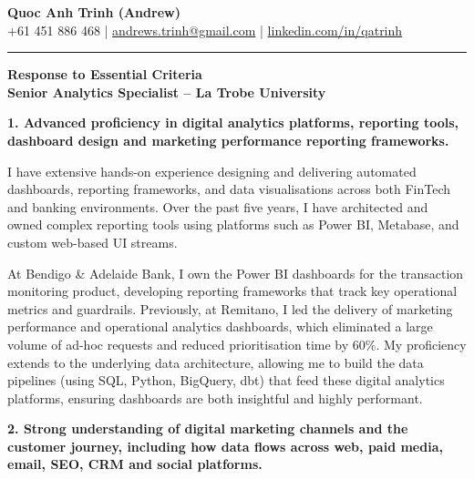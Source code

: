 \documentclass[11pt, a4paper]{article}
\begin{document}
\begin{center}
    {\LARGE \textbf{Quoc Anh Trinh (Andrew)}}\\[4pt]
    {\small
        +61 451 886 468 \quad|\quad
        \href{mailto:andrews.trinh@gmail.com}{andrews.trinh@gmail.com} \quad|\quad
        \href{https://www.linkedin.com/in/qatrinh}{linkedin.com/in/qatrinh}
    }
\end{center}

\vspace{4pt}
\hrule
\vspace{14pt}

\begin{center}
    {\Large \textbf{Response to Essential Criteria}}\\[4pt]
    {\large \textbf{Senior Analytics Specialist -- La Trobe University}}
\end{center}

\vspace{10pt}

\textbf{1. Advanced proficiency in digital analytics platforms, reporting tools, dashboard design and marketing performance reporting frameworks.}

I have extensive hands-on experience designing and delivering automated dashboards, reporting frameworks, and data visualisations across both FinTech and banking environments. Over the past five years, I have architected and owned complex reporting tools using platforms such as Power BI, Metabase, and custom web-based UI streams. 

At Bendigo \& Adelaide Bank, I own the Power BI dashboards for the transaction monitoring product, developing reporting frameworks that track key operational metrics and guardrails. Previously, at Remitano, I led the delivery of marketing performance and operational analytics dashboards, which eliminated a large volume of ad-hoc requests and reduced prioritisation time by 60\%. My proficiency extends to the underlying data architecture, allowing me to build the data pipelines (using SQL, Python, BigQuery, dbt) that feed these digital analytics platforms, ensuring dashboards are both insightful and highly performant.

\textbf{2. Strong understanding of digital marketing channels and the customer journey, including how data flows across web, paid media, email, SEO, CRM and social platforms.}
\end{document}
